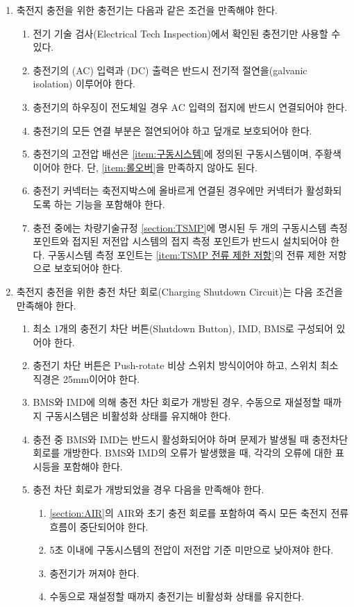 \documentclass[final,a4paper,10pt]{report}
\begin{document}
\begin{enumerate}
  \item 축전지 충전을 위한 충전기는 다음과 같은 조건을 만족해야 한다.
    \begin{enumerate}
      \item 전기 기술 검사(Electrical Tech Inspection)에서 확인된 충전기만 사용할 수 있다.
      \item 충전기의 (AC) 입력과 (DC) 출력은 반드시 전기적 절연을(galvanic isolation) 이루어야 한다.
      \item 충전기의 하우징이 전도체일 경우 AC 입력의 접지에 반드시 연결되어야 한다.
      \item 충전기의 모든 연결 부분은 절연되어야 하고 덮개로 보호되어야 한다.
      \item 충전기의 고전압 배선은 \cref{item:구동시스템}에 정의된 구동시스템이며, 주황색이어야 한다. 단, \cref{item:롤오버}을 만족하지 않아도 된다.
      \item 충전기 커넥터는 축전지박스에 올바르게 연결된 경우에만 커넥터가 활성화되도록 하는 기능을 포함해야 한다.
      \item 충전 중에는 차량기술규정 \cref{section:TSMP}에 명시된 두 개의 구동시스템 측정 포인트와 접지된 저전압 시스템의 접지 측정 포인트가 반드시 설치되어야 한다. 구동시스템 측정 포인트는 \cref{item:TSMP 전류 제한 저항}의 전류 제한 저항으로 보호되어야 한다.
    \end{enumerate}
    
  \item 축전지 충전을 위한 충전 차단 회로(Charging Shutdown Circuit)는 다음 조건을 만족해야 한다. \label{item:충전 차단 회로}
    \begin{enumerate}
      \item 최소 1개의 충전기 차단 버튼(Shutdown Button), IMD, BMS로 구성되어 있어야 한다.
      \item 충전기 차단 버튼은 Push-rotate 비상 스위치 방식이어야 하고, 스위치 최소 직경은 25mm이어야 한다.
      \item BMS와 IMD에 의해 충전 차단 회로가 개방된 경우, 수동으로 재설정할 때까지 구동시스템은 비활성화 상태를 유지해야 한다.
      \item 충전 중 BMS와 IMD는 반드시 활성화되어야 하며 문제가 발생될 때 충전차단회로를 개방한다. BMS와 IMD의 오류가 발생했을 때, 각각의 오류에 대한 표시등을 포함해야 한다.
      
      \item 충전 차단 회로가 개방되었을 경우 다음을 만족해야 한다.
        \begin{enumerate}
          \item \cref{section:AIR}의 AIR와 초기 충전 회로를 포함하여 즉시 모든 축전지 전류 흐름이 중단되어야 한다.
          \item 5초 이내에 구동시스템의 전압이 저전압 기준 미만으로 낮아져야 한다.
          \item 충전기가 꺼져야 한다.
          \item 수동으로 재설정할 때까지 충전기는 비활성화 상태를 유지한다.
        \end{enumerate}
        

\end{enumerate}
\end{enumerate}
\end{document}
